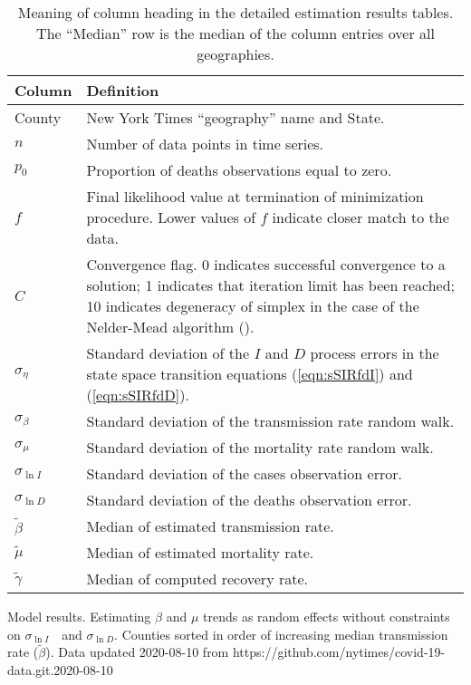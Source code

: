 \documentclass[12pt,letterpaper]{article}
\newcommand\slI{$\sigma_{\ln I}$\ }
\newcommand\slD{$\sigma_{\ln D}$}
\begin{document}
{\begin{appendices}
\begin{table}[!ht]
\caption{\label{tab:colheads}
Meaning of column heading in the detailed estimation results tables.
The ``Median'' row is the median of the column entries over all
geographies.
}
\begin{tabularx}{\textwidth}{ l X }
\hline
Column & Definition\\
\hline
County & New York Times ``geography'' name and State.\\
$n$ & Number of data points in time series.\\
$p_0$ &  Proportion of deaths observations equal to zero.\\
$f$ & Final likelihood value at termination of minimization
procedure. Lower values of $f$ indicate closer match to the data.\\
$C$ & Convergence flag. 0 indicates successful convergence to a
solution; 1 indicates that iteration limit has been reached; 10
indicates degeneracy of simplex in the case of the Nelder-Mead
algorithm (\cite{Baudin2010}).\\
$\sigma_\eta$ & Standard deviation of the $I$ and $D$ process errors
in the state space transition equations (\ref{eqn:sSIRfdI}) and
(\ref{eqn:sSIRfdD}).\\
$\sigma_\beta$ & Standard deviation of the transmission rate random
walk.\\
$\sigma_\mu$ & Standard deviation of the mortality rate random walk.\\
$\sigma_{\ln I}$ & Standard deviation of the cases observation error.\\
$\sigma_{\ln D}$ & Standard deviation of the deaths observation error.\\
$\tilde{\beta}$ & Median of estimated transmission rate.\\
$\tilde{\mu}$ & Median of estimated mortality rate.\\
$\tilde\gamma$ & Median of computed recovery rate.\\
\hline

\end{tabularx}

\end{table}


\begin{sidewaystable}
\caption{\label{tab:uncons}
Model results. Estimating $\beta$ and $\mu$ trends as random effects
without constraints on  \slI\ and \slD. 
Counties sorted in order of increasing median transmission rate ($\tilde\beta$).
Data updated 2020-08-10 from https://github.com/nytimes/covid-19-data.git.2020-08-10
}
\centering
{\scriptsize

}
\end{sidewaystable}
\end{appendices}}
\end{document}
